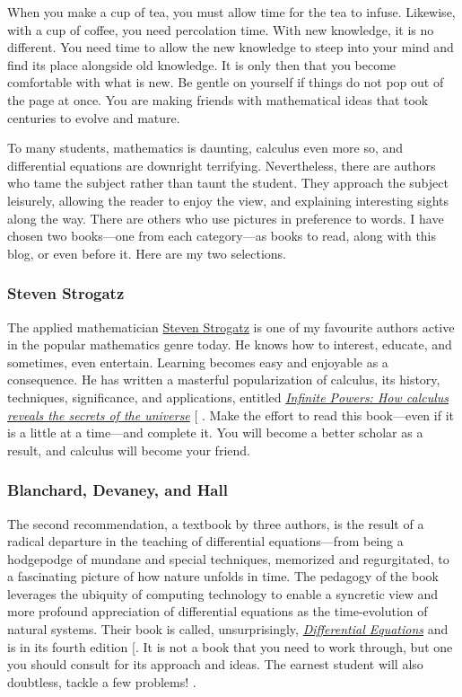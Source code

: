 \documentclass[
  a4paper,
]{article}
\begin{document}
When you make a cup of tea, you must allow time for the tea to infuse.
Likewise, with a cup of coffee, you need percolation time. With new
knowledge, it is no different. You need time to allow the new knowledge
to steep into your mind and find its place alongside old knowledge. It
is only then that you become comfortable with what is new. Be gentle on
yourself if things do not pop out of the page at once. You are making
friends with mathematical ideas that took centuries to evolve and
mature.

To many students, mathematics is daunting, calculus even more so, and
differential equations are downright terrifying. Nevertheless, there are
authors who tame the subject rather than taunt the student. They
approach the subject leisurely, allowing the reader to enjoy the view,
and explaining interesting sights along the way. There are others who
use pictures in preference to words. I have chosen two books---one from
each category---as books to read, along with this blog, or even before
it. Here are my two selections.

\subsubsection{Steven Strogatz}\label{steven-strogatz}

The applied mathematician
\href{https://en.wikipedia.org/wiki/Steven_Strogatz}{Steven Strogatz} is
one of my favourite authors active in the popular mathematics genre
today. He knows how to interest, educate, and sometimes, even entertain.
Learning becomes easy and enjoyable as a consequence. He has written a
masterful popularization of calculus, its history, techniques,
significance, and applications, entitled
\href{https://www.stevenstrogatz.com/books/infinite-powers}{\emph{Infinite
Powers: How calculus reveals the secrets of the universe}}
{[}\citeproc{ref-strogatz-2019}{1}{]} . Make the effort to read this
book---even if it is a little at a time---and complete it. You will
become a better scholar as a result, and calculus will become your
friend.

\subsubsection{Blanchard, Devaney, and
Hall}\label{blanchard-devaney-and-hall}

The second recommendation, a textbook by three authors, is the result of
a radical departure in the teaching of differential equations---from
being a hodgepodge of mundane and special techniques, memorized and
regurgitated, to a fascinating picture of how nature unfolds in time.
The pedagogy of the book leverages the ubiquity of computing technology
to enable a syncretic view and more profound appreciation of
differential equations as the time-evolution of natural systems. Their
book is called, unsurprisingly,
\href{http://math.bu.edu/odes/4ed-TOC.html}{\emph{Differential
Equations}} and is in its fourth edition
{[}\citeproc{ref-blanchard-devaney-hall-2012}{2}{]}. It is not a book
that you need to work through, but one you should consult for its
approach and ideas. The earnest student will also doubtless, tackle a
few problems!  \normalfont.
\end{document}
